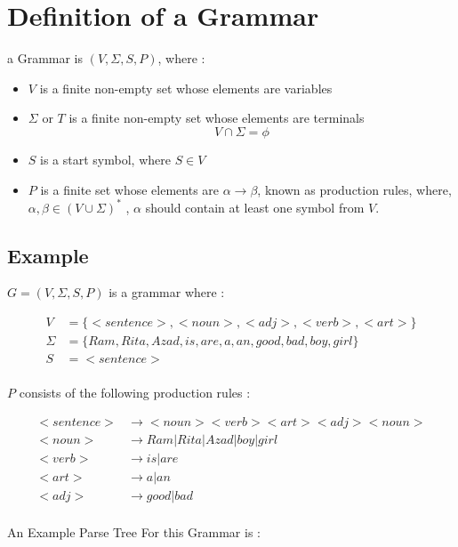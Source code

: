 \documentclass[12pt]{book}
\begin{document}
\section{Definition of a Grammar}

a Grammar is $(V , \Sigma , S , P)$, where :

\begin{itemize}
	\item $V$ is a finite non-empty set whose elements are variables
	\item $\Sigma$ or $T$ is a finite non-empty set whose elements are terminals
	$$
	V \cap \Sigma = \phi
	$$
	\item $S$ is a start symbol, where $S \in V$
	\item $P$ is a finite set whose elements are $\alpha \to \beta$, known as production rules, where, $\alpha, \beta \in ( V \cup \Sigma )^{*}$ , $\alpha$ should contain at least one symbol from $V$.
\end{itemize}

\subsection{Example}

$G = (V , \Sigma, S , P) $ is a grammar where :


\begin{align*}
V &= \{ <sentence> , <noun> , <adj> , <verb> , <art> \} \\
\Sigma &= \{ Ram, Rita, Azad, is , are, a , an , good, bad , boy , girl \} \\
S &= <sentence> \\
\end{align*}


$P$ consists of the following production rules :

\begin{align*}
<sentence> &\to <noun><verb><art><adj><noun> \\
<noun> &\to Ram | Rita | Azad | boy | girl \\
<verb> &\to is | are \\
<art> &\to a | an \\
<adj> &\to good | bad  \\
\end{align*}


An Example Parse Tree For this Grammar is :

\end{document}
